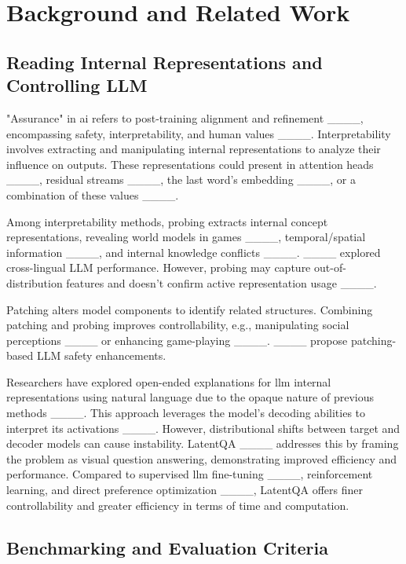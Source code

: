 \section{Background and Related Work}
\label{related-works}


\subsection{Reading Internal Representations and Controlling LLM}


"Assurance" in \ac{ai} refers to post-training alignment and refinement ____, encompassing safety, interpretability, and human values ____. Interpretability involves extracting and manipulating internal representations to analyze their influence on outputs.
These representations could present in attention heads ____, residual streams ____, the last word's embedding ____, or a combination of these values ____. 


Among interpretability methods, probing extracts internal concept representations, revealing world models in games ____, temporal/spatial information ____, and internal knowledge conflicts ____.  ____ explored cross-lingual LLM performance. However, probing may capture out-of-distribution features and doesn't confirm active representation usage ____.


Patching alters model components to identify related structures. Combining patching and probing improves controllability, e.g., manipulating social perceptions ____ or enhancing game-playing ____. ____ propose patching-based LLM safety enhancements.
  

Researchers have explored open-ended explanations for \ac{llm} internal representations using natural language due to the opaque nature of previous methods ____.  This approach leverages the model's decoding abilities to interpret its activations ____. However, distributional shifts between target and decoder models can cause instability.  LatentQA ____ addresses this by framing the problem as visual question answering, demonstrating improved efficiency and performance. Compared to supervised \ac{llm} fine-tuning ____, reinforcement learning, and direct preference optimization ____, LatentQA offers finer controllability and greater efficiency in terms of time and computation.


\subsection{Benchmarking and Evaluation Criteria}


